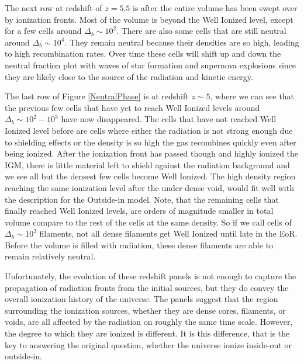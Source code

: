 The next row at redshift of $z=5.5$ is after the entire volume has been swept over by ionization fronts.  Most of the volume is beyond the Well Ionized level, except for a few cells around $\Delta_b \sim 10^2$.  There are also some cells that are still neutral around $\Delta_b \sim 10^4$.  They remain neutral because their densities are so high, leading to high recombination rates.  Over time these cells will shift up and down the neutral fraction plot with waves of star formation and supernova explosions since they are likely close to the source of the radiation and kinetic energy.

The last row of Figure \ref{NeutralPhase} is at redshift $z\sim5$, where we can see that the previous few cells that have yet to reach Well Ionized levels around $\Delta_b \sim 10^2-10^3$ have now disappeared.  The cells that have not reached Well Ionized level before are cells where either the radiation is not strong enough due to shielding effects or the density is so high the gas recombines quickly even after being ionized.  After the ionization front has passed though and highly ionized the IGM, there is little material left to shield against the radiation background and we see all but the densest few cells become Well Ionized. The high density region reaching the same ionization level after the under dense void, would fit well with the description for the Outside-in model.  Note, that the remaining cells that finally reached Well Ionized levels, are orders of magnitude smaller in total volume compare to the rest of the cells at the same density.  So if we call cells of $\Delta_b \sim 10^2$ filaments, not all dense filaments get Well Ionized until late in the EoR.  Before the volume is filled with radiation, these dense filaments are able to remain relatively neutral.

Unfortunately, the evolution of these redshift panels is not enough to capture the propagation of radiation fronts from the initial sources, but they do convey the overall ionization history of the universe.  The panels suggest that the region surrounding the ionization sources, whether they are dense cores, filaments, or voids, are all affected by the radiation on roughly the same time scale.  However, the degree to which they are ionized is different.  It is this difference, that is the key to answering the original question, whether the universe ionize inside-out or outside-in.  

